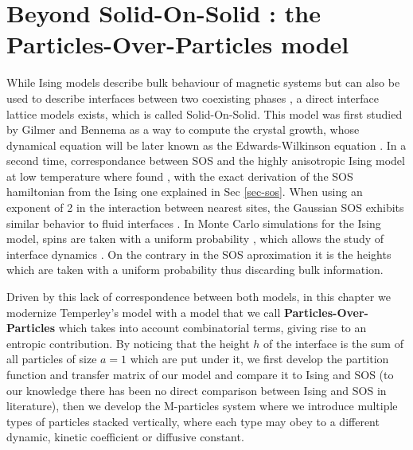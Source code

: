 \chapter{Beyond Solid-On-Solid : the Particles-Over-Particles model}
\label{chap-pop}

While Ising models describe bulk behaviour of magnetic systems \cite{niss_history_2005,niss_history_2009} but can also be used to describe interfaces between two coexisting phases \cite{abraham_interface_1976}, a direct interface lattice models exists, which is called Solid-On-Solid. This model was first studied by Gilmer and Bennema \cite{gilmer_computer_1972,gilmer_simulation_1972} as a way to compute the crystal growth, whose dynamical equation will be later known as the Edwards-Wilkinson equation \cite{edwards_surface_1982,halpin-healy_kinetic_1995} . In a second time, correspondance between SOS and the highly anisotropic Ising model at low temperature where found \cite{swendsen_roughening_1977,guyer_sine-gordon_1979}, with the exact derivation of the SOS hamiltonian from the Ising one explained in Sec \ref{sec-sos}. When using an exponent of 2 in the interaction between nearest sites, the Gaussian SOS exhibits similar behavior to fluid interfaces \cite{muller-krumbhaar_kinetic_1976,baillie_solid_1993}.
In Monte Carlo simulations for the Ising model, spins are taken with a uniform probability \cite{metropolis_monte_1949,newman_monte_1999}, which allows the study of interface dynamics \cite{schmittmann_driven_1998,muller_profile_2005,smith_interfaces_2008-1,smith_lateral_2010}. On the contrary in the SOS aproximation it is the heights which are taken with a uniform probability \cite{wilby_scaling_1992,siegert_scaling_1993} thus discarding bulk information. 

Driven by this lack of correspondence between both models, in this chapter we modernize Temperley's model \cite{temperley_statistical_1952} with a model that we call {\bf Particles-Over-Particles} which takes into account combinatorial terms, giving rise to an entropic contribution.
By noticing that the height $h$ of the interface is the sum of all particles of size $a=1$ which are put under it, we first develop the partition function and transfer matrix of our model and compare it to Ising and SOS (to our knowledge there has been no direct comparison between Ising and SOS in literature), then we develop the M-particles system where we introduce multiple types of particles stacked vertically, where each type may obey to a different dynamic, kinetic coefficient or diffusive constant.

